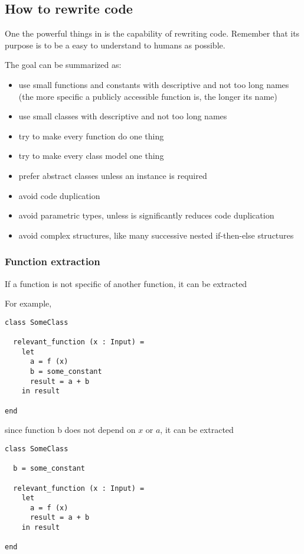 \subsection{How to rewrite \Soda code}

One the powerful things in \Soda is the capability of rewriting code.
Remember that its purpose is to be a easy to understand to humans as possible.

The goal can be summarized as:

\begin{itemize}
    \item use small functions and constants with descriptive and not too long names
    (the more specific a publicly accessible function is, the longer its name)
    \item use small classes with descriptive and not too long names
    \item try to make every function do one thing
    \item try to make every class model one thing
    \item prefer abstract classes unless an instance is required
    \item avoid code duplication
    \item avoid parametric types, unless is significantly reduces code duplication
    \item avoid complex structures, like many successive nested if-then-else structures
\end{itemize}

\subsubsection{Function extraction}

If a function is not specific of another function, it can be extracted

For example,

\begin{lstlisting}[label={lst:rewritingFunctionExtractionBefore}]
class SomeClass

  relevant_function (x : Input) =
    let
      a = f (x)
      b = some_constant
      result = a + b
    in result

end
\end{lstlisting}

since function b does not depend on $x$ or $a$, it can be extracted

\begin{lstlisting}[label={lst:rewritingFunctionExtractionAfter0}]
class SomeClass

  b = some_constant

  relevant_function (x : Input) =
    let
      a = f (x)
      result = a + b
    in result

end
\end{lstlisting}

